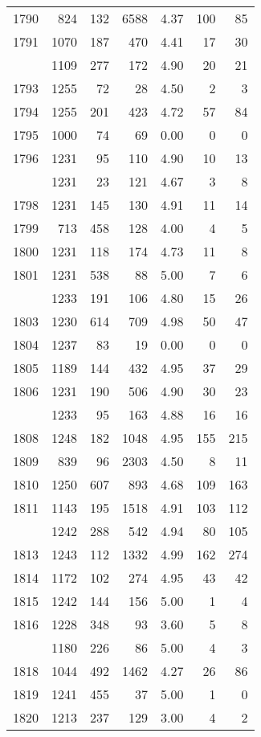 \documentclass[
]{article}
\begin{document}
\begin{table}
\begin{tabular}[t]{lrrrrrr}
1790 & 824 & 132 & 6588 & 4.37 & 100 & 85\\
1791 & 1070 & 187 & 470 & 4.41 & 17 & 30\\
\addlinespace
1792 & 1109 & 277 & 172 & 4.90 & 20 & 21\\
1793 & 1255 & 72 & 28 & 4.50 & 2 & 3\\
1794 & 1255 & 201 & 423 & 4.72 & 57 & 84\\
1795 & 1000 & 74 & 69 & 0.00 & 0 & 0\\
1796 & 1231 & 95 & 110 & 4.90 & 10 & 13\\
\addlinespace
1797 & 1231 & 23 & 121 & 4.67 & 3 & 8\\
1798 & 1231 & 145 & 130 & 4.91 & 11 & 14\\
1799 & 713 & 458 & 128 & 4.00 & 4 & 5\\
1800 & 1231 & 118 & 174 & 4.73 & 11 & 8\\
1801 & 1231 & 538 & 88 & 5.00 & 7 & 6\\
\addlinespace
1802 & 1233 & 191 & 106 & 4.80 & 15 & 26\\
1803 & 1230 & 614 & 709 & 4.98 & 50 & 47\\
1804 & 1237 & 83 & 19 & 0.00 & 0 & 0\\
1805 & 1189 & 144 & 432 & 4.95 & 37 & 29\\
1806 & 1231 & 190 & 506 & 4.90 & 30 & 23\\
\addlinespace
1807 & 1233 & 95 & 163 & 4.88 & 16 & 16\\
1808 & 1248 & 182 & 1048 & 4.95 & 155 & 215\\
1809 & 839 & 96 & 2303 & 4.50 & 8 & 11\\
1810 & 1250 & 607 & 893 & 4.68 & 109 & 163\\
1811 & 1143 & 195 & 1518 & 4.91 & 103 & 112\\
\addlinespace
1812 & 1242 & 288 & 542 & 4.94 & 80 & 105\\
1813 & 1243 & 112 & 1332 & 4.99 & 162 & 274\\
1814 & 1172 & 102 & 274 & 4.95 & 43 & 42\\
1815 & 1242 & 144 & 156 & 5.00 & 1 & 4\\
1816 & 1228 & 348 & 93 & 3.60 & 5 & 8\\
\addlinespace
1817 & 1180 & 226 & 86 & 5.00 & 4 & 3\\
1818 & 1044 & 492 & 1462 & 4.27 & 26 & 86\\
1819 & 1241 & 455 & 37 & 5.00 & 1 & 0\\
1820 & 1213 & 237 & 129 & 3.00 & 4 & 2\\

\end{tabular}
\end{table}
\end{document}

